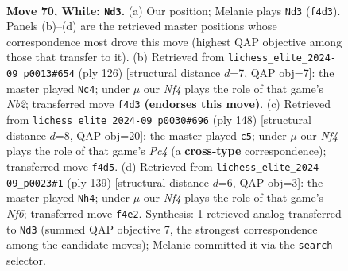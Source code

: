 \documentclass[11pt]{article}
\begin{document}
\clearpage

\begin{figure}[p]\centering
\begin{subfigure}{0.46\textwidth}\centering
\resizebox{\linewidth}{!}{%
\newchessgame
\chessboard[
  setfen={8/8/8/1k6/5N2/R7/3K2P1/5r2 w - - 4 70},
  showmover=false,
  pgfstyle=straightmove, color=movearrow, markmove={f4-d3}
]}
\caption{}
\end{subfigure}\hfill
\begin{subfigure}{0.46\textwidth}\centering
\resizebox{\linewidth}{!}{%
\newchessgame
\chessboard[
  setfen={4k3/R7/8/8/8/3K4/1N6/1r6 w - - 1 64},
  showmover=false,
  pgfstyle=straightmove, color=movearrow, markmove={b2-c4}
]}
\caption{}
\end{subfigure}
\\[4pt]
\begin{subfigure}{0.46\textwidth}\centering
\resizebox{\linewidth}{!}{%
\newchessgame
\chessboard[
  setfen={8/2k5/6R1/8/2Pr4/8/4P3/4K3 w - - 11 75},
  showmover=false,
  pgfstyle=straightmove, color=movearrow, markmove={c4-c5}
]}
\caption{}
\end{subfigure}\hfill
\begin{subfigure}{0.46\textwidth}\centering
\resizebox{\linewidth}{!}{%
\newchessgame
\chessboard[
  setfen={5R2/8/8/6p1/4K3/5n1k/8/8 b - - 0 70},
  showmover=false,
  pgfstyle=straightmove, color=movearrow, markmove={f3-h4}
]}
\caption{}
\end{subfigure}
\caption{\textbf{Move 70, White: \texttt{Nd3}.} (a) Our position; Melanie plays \texttt{Nd3} (\texttt{f4d3}). Panels (b)--(d) are the retrieved master positions whose correspondence most drove this move (highest QAP objective among those that transfer to it). (b) Retrieved from \texttt{lichess\_elite\_2024-09\_p0013\#654} (ply 126) [structural distance $d$=7, QAP obj=7]: the master played \texttt{Nc4}; under $\mu$ our \emph{Nf4} plays the role of that game's \emph{Nb2}; transferred move \texttt{f4d3} \textbf{(endorses this move)}. (c) Retrieved from \texttt{lichess\_elite\_2024-09\_p0030\#696} (ply 148) [structural distance $d$=8, QAP obj=20]: the master played \texttt{c5}; under $\mu$ our \emph{Nf4} plays the role of that game's \emph{Pc4} (a \textbf{cross-type} correspondence); transferred move \texttt{f4d5}. (d) Retrieved from \texttt{lichess\_elite\_2024-09\_p0023\#1} (ply 139) [structural distance $d$=6, QAP obj=3]: the master played \texttt{Nh4}; under $\mu$ our \emph{Nf4} plays the role of that game's \emph{Nf6}; transferred move \texttt{f4e2}. Synthesis: 1 retrieved analog transferred to \texttt{Nd3} (summed QAP objective 7, the strongest correspondence among the candidate moves); Melanie committed it via the \texttt{search} selector.}
\label{fig:thought-m138}
\end{figure}
\end{document}
